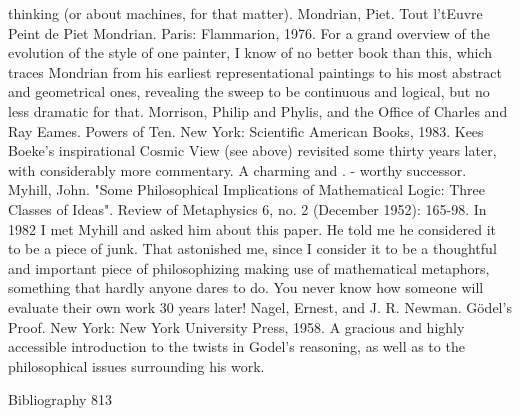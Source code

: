  thinking (or about machines, for that matter).
Mondrian, Piet. Tout l'tEuvre Peint de Piet Mondrian. Paris: Flammarion, 1976. For a grand
  overview of the evolution of the style of one painter, I know of no better book than this,
  which traces Mondrian from his earliest representational paintings to his most abstract and
  geometrical ones, revealing the sweep to be continuous and logical, but no less dramatic for
  that.
Morrison, Philip and Phylis, and the Office of Charles and Ray Eames. Powers of Ten. New
  York: Scientific American Books, 1983. Kees Boeke's inspirational Cosmic View (see
  above) revisited some thirty years later, with considerably more commentary. A charming
  and . - worthy successor.
Myhill, John. "Some Philosophical Implications of Mathematical Logic: Three Classes of
  Ideas". Review of Metaphysics 6, no. 2 (December 1952): 165-98. In 1982 I met Myhill and
  asked him about this paper. He told me he considered it to be a piece of junk. That
  astonished me, since I consider it to be a thoughtful and important piece of philosophizing
  making use of mathematical metaphors, something that hardly anyone dares to do. You
  never know how someone will evaluate their own work 30 years later!
Nagel, Ernest, and J. R. Newman. Gödel’s Proof. New York: New York University Press,
  1958. A gracious and highly accessible introduction to the twists in Godel's reasoning, as
  well as to the philosophical issues surrounding his work.


Bibliography                                                                             813

